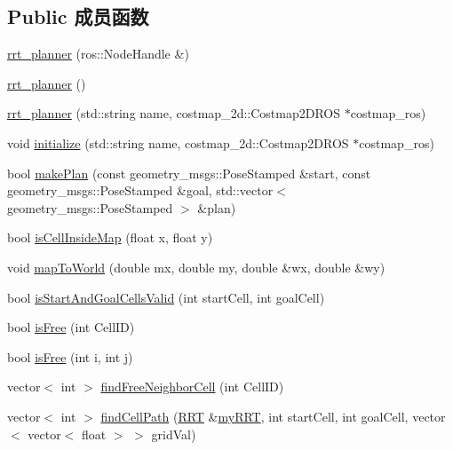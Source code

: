 \subsection*{Public 成员函数}
\begin{DoxyCompactItemize}
\item 
\hyperlink{classrrt__plan_1_1rrt__planner_a188d2961064c51462f133f656b5595ce}{rrt\-\_\-planner} (ros\-::\-Node\-Handle \&)
\item 
\hyperlink{classrrt__plan_1_1rrt__planner_aff0490fe901b891f586fae31433f72f0}{rrt\-\_\-planner} ()
\item 
\hyperlink{classrrt__plan_1_1rrt__planner_a0c6d148e4c72d2cd780831b7b2e7ad2c}{rrt\-\_\-planner} (std\-::string name, costmap\-\_\-2d\-::\-Costmap2\-D\-R\-O\-S $\ast$costmap\-\_\-ros)
\item 
void \hyperlink{classrrt__plan_1_1rrt__planner_aec216e5abd94aa73b71a4db4a3e89c9d}{initialize} (std\-::string name, costmap\-\_\-2d\-::\-Costmap2\-D\-R\-O\-S $\ast$costmap\-\_\-ros)
\item 
bool \hyperlink{classrrt__plan_1_1rrt__planner_a211f1d665d81c1a340d06cdc327fadf4}{make\-Plan} (const geometry\-\_\-msgs\-::\-Pose\-Stamped \&start, const geometry\-\_\-msgs\-::\-Pose\-Stamped \&goal, std\-::vector$<$ geometry\-\_\-msgs\-::\-Pose\-Stamped $>$ \&plan)
\item 
bool \hyperlink{classrrt__plan_1_1rrt__planner_a07347499c296c693631f24dfb1cb4196}{is\-Cell\-Inside\-Map} (float x, float y)
\item 
void \hyperlink{classrrt__plan_1_1rrt__planner_a7cbacb0aead733fc6cfde463c6ea2812}{map\-To\-World} (double mx, double my, double \&wx, double \&wy)
\item 
bool \hyperlink{classrrt__plan_1_1rrt__planner_aa43a4ec62844e679d9e0aefcbfa5f286}{is\-Start\-And\-Goal\-Cells\-Valid} (int start\-Cell, int goal\-Cell)
\item 
bool \hyperlink{classrrt__plan_1_1rrt__planner_a7c923acf8ea571bf84a2ede5a0457491}{is\-Free} (int Cell\-I\-D)
\item 
bool \hyperlink{classrrt__plan_1_1rrt__planner_ac6b3b3e1aa57e2dd76874064f289f370}{is\-Free} (int i, int j)
\item 
vector$<$ int $>$ \hyperlink{classrrt__plan_1_1rrt__planner_a0a4d334b13d1946044f041ae1ddc1a41}{find\-Free\-Neighbor\-Cell} (int Cell\-I\-D)
\item 
vector$<$ int $>$ \hyperlink{classrrt__plan_1_1rrt__planner_a23e32ef1c189f5035a751047f84e052a}{find\-Cell\-Path} (\hyperlink{classRRT}{R\-R\-T} \&\hyperlink{rrt__planner_8cpp_a51725e16375c08b52f82eb2faa5a921c}{my\-R\-R\-T}, int start\-Cell, int goal\-Cell, vector$<$ vector$<$ float $>$ $>$ grid\-Val)

\end{DoxyCompactItemize}
